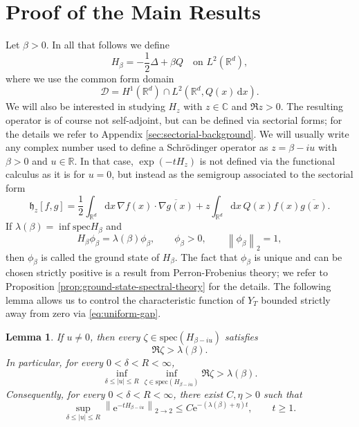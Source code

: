 \documentclass[11pt,reqno]{amsart}
\newtheorem{lemma}[theorem]{Lemma}
\theoremstyle{definition}
\numberwithin{equation}{section}
\newcommand{\<}{\langle}
\renewcommand{\>}{\rangle}
\def\spec{{\rm spec}}
\def\R{{\mathbb R}}
\def\de{{\rm d}}
\def\spec{{\mathrm {spec}}}
\def\de{{\mathrm {d}}}
\def\lt{\left}
\def\rt{\right}
\def\bbC{{\mathbb{C}}}
\newcommand{\norm}[1]{{\lt\|#1\rt\|}}
\begin{document}
\section{Proof of the Main Results}
\label{sec:main_sec}
Let $\beta >0$. In all that follows we define
\[
 H_\beta=-\frac12\Delta+\beta Q
 \quad\text{on }L^2(\mathbb R^d),
\]
where we use the common form domain 
\[
  \mathcal D
  =H^1(\mathbb R^d)\cap L^2(\mathbb R^d,Q(x)\,\de x).
\]
We will also be interested in studying $H_z$ with $z \in \bbC$ and $\Re z > 0$. The resulting operator is of course not self-adjoint, but can be defined via sectorial forms; for the details we refer to Appendix \ref{sec:sectorial-background}. We will usually write any complex number used to define a Schrödinger operator as $z = \beta - i u$ with  $\beta > 0$ and $u \in \R$. In that case, $\exp(-tH_z)$ is not defined via the functional calculus as it is for $u = 0$, but instead 
as
the semigroup associated 
to the sectorial form 
\begin{equation}
    \nonumber
  \mathfrak h_z[f,g]
  =\frac12\int_{\mathbb R^d} \de x \, \nabla f(x)\cdot\overline{\nabla g(x)}
     +z\int_{\mathbb R^d} \de x \, Q(x)f(x)\overline{g(x)}.
\end{equation}
If $\lambda(\beta)=\inf\spec H_\beta$ and
\begin{equation}
    \nonumber
    H_\beta\phi_\beta=\lambda(\beta)\phi_\beta,
 \qquad \phi_\beta>0,\qquad \norm{\phi_\beta}_2=1,
\end{equation}
then $\phi_\beta$ is called the ground state of $H_\beta$. The fact that $\phi_\beta$ is unique and can be chosen strictly positive is a result from Perron-Frobenius theory; we  refer to Proposition \ref{prop:ground-state-spectral-theory} for the details.
The following lemma allows us to control the characteristic function of $Y_T$ bounded strictly away from zero via \eqref{eq:uniform-gap}.
\begin{lemma}
\label{lemma:strict_spectral_gap}
If $u\neq0$, then every $\zeta\in\spec(H_{\beta-iu})$ satisfies
\begin{equation}
 \Re\zeta>\lambda(\beta).
 \label{eq:strict-gap}
\end{equation}
In particular, for every $0<\delta < R <\infty$,
\begin{equation}
    \label{equ:fourier_annulus_uniform}
 \inf_{\delta\leq|u|\leq R}
 \inf_{\zeta\in\spec(H_{\beta-iu})}\Re\zeta>\lambda (\beta).
\end{equation}
Consequently, for every $0<\delta<R<\infty$, there exist $C,\eta>0$ such
that
\begin{equation}
 \sup_{\delta\leq|u|\leq R}
 \norm{\mathrm e^{-tH_{\beta-iu}}}_{2 \to 2}
 \leq C \mathrm e^{-(\lambda(\beta)+\eta)t},
 \qquad t\geq1.
 \label{eq:uniform-gap}
\end{equation}
\end{lemma}
\end{document}
